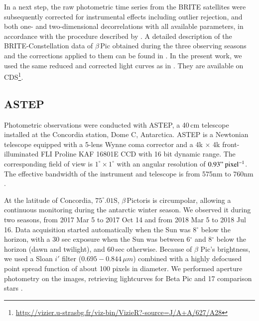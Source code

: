 \documentclass[longauth]{aa} %
\newcommand{\bp}{$\beta$\,Pic}
\begin{document}
In a next step, the raw photometric time series from the BRITE satellites were subsequently corrected for instrumental effects including outlier rejection, and both one- and two-dimensional decorrelations with all available parameters, in accordance with the procedure described by \citet{pigulski2018}.
%
A detailed description of the BRITE-Constellation data of \bp{} obtained during the three observing seasons and the corrections applied to them can be found in \citet{Zwintz19}.
%
In the present work, we used the same reduced and corrected light curves as in \citet{Zwintz19}. They are available on CDS\footnote{\href{http://vizier.u-strasbg.fr/viz-bin/VizieR?-source=J/A+A/627/A28}{http://vizier.u-strasbg.fr/viz-bin/VizieR?-source=J/A+A/627/A28}}.

\subsection{ASTEP}

Photometric observations were conducted with ASTEP, a 40\,cm telescope installed at the Concordia station, Dome C, Antarctica.
%
ASTEP is a Newtonian telescope equipped with a 5-lens Wynne coma corrector and a 4k $\times$ 4k front-illuminated FLI Proline KAF 16801E CCD with 16 bit dynamic range.
%
The corresponding field of view is $1^\circ\times 1^\circ$ with an angular resolution of $0.93"\rm\ pixel^{-1}$.
%
The effective bandwidth of the instrument and telescope is from 575nm to 760nm \citep{Abe13}.

At the latitude of Concordia, $75^{\circ}.01$S, $\beta$\,Pictoris is circumpolar, allowing a continuous monitoring during the antarctic winter season.
%
We observed it during two seasons, from 
2017 Mar 5 to 2017 Oct 14 and from 2018 Mar 5 to 2018 Jul 16.
%
Data acquisition started automatically when the Sun was 8$^{\circ}$ below the horizon, with a 30 sec exposure when the Sun was between 6$^{\circ}$ and 8$^{\circ}$ below the horizon (dawn and twilight), and 60\,sec otherwise.
%
Because of $\beta$ Pic's brightness, we used a Sloan $i'$ filter ($0.695-0.844\,\mu m$) combined with a highly defocused point spread function of about 100 pixels in diameter.
%
We performed aperture photometry on the images, retrieving lightcurves for Beta Pic and 17 comparison stars \citep[see][]{Mekarnia2017}.
\end{document}
